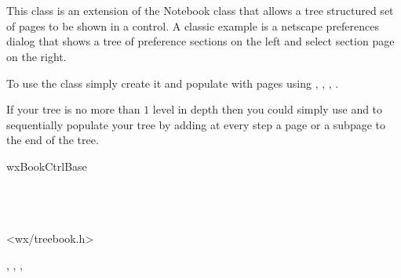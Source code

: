 
\section{}\label{wxtreebook}

This class is an extension of the Notebook class that allows a tree structured
set of pages to be shown in a control.
A classic example is a netscape preferences dialog that shows a tree
of preference sections on the left and select section page on the right.

To use the class simply create it and populate with pages using
,
,
,
.

If your tree is no more than $1$ level in depth then you could
simply use  and 
 to sequentially populate your tree
by adding at every step a page or a subpage to the end of the tree.



wxBookCtrlBase\\
\\
\\
\\



<wx/treebook.h>





, , , 





\label{wxtreebookwxtreebook}

